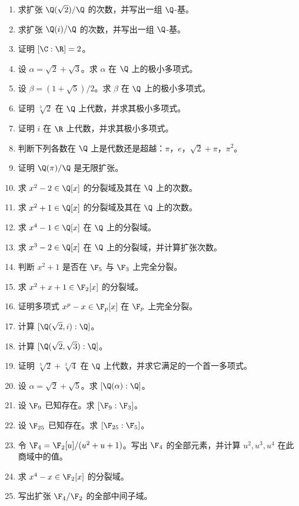 \begin{enumerate}[label=\arabic*., leftmargin=2.5em]
\item \textbf{\basic} 求扩张 $\Q(\sqrt2)/\Q$ 的次数，并写出一组 $\Q$-基。
\item \textbf{\basic} 求扩张 $\Q(i)/\Q$ 的次数，并写出一组 $\Q$-基。
\item \textbf{\basic} 证明 $[\C:\R]=2$。
\item \textbf{\basic} 设 $\alpha=\sqrt2+\sqrt3$。求 $\alpha$ 在 $\Q$ 上的极小多项式。
\item \textbf{\basic} 设 $\beta=(1+\sqrt5)/2$。求 $\beta$ 在 $\Q$ 上的极小多项式。
\item \textbf{\basic} 证明 $\sqrt[3]{2}$ 在 $\Q$ 上代数，并求其极小多项式。
\item \textbf{\basic} 证明 $i$ 在 $\R$ 上代数，并求其极小多项式。
\item \textbf{\basic} 判断下列各数在 $\Q$ 上是代数还是超越：$\pi$，$e$，$\sqrt2+\pi$，$\pi^2$。
\item \textbf{\basic} 证明 $\Q(\pi)/\Q$ 是无限扩张。
\item \textbf{\basic} 求 $x^2-2\in\Q[x]$ 的分裂域及其在 $\Q$ 上的次数。
\item \textbf{\basic} 求 $x^2+1\in\Q[x]$ 的分裂域及其在 $\Q$ 上的次数。
\item \textbf{\basic} 求 $x^4-1\in\Q[x]$ 在 $\Q$ 上的分裂域。
\item \textbf{\basic} 求 $x^3-2\in\Q[x]$ 在 $\Q$ 上的分裂域，并计算扩张次数。
\item \textbf{\basic} 判断 $x^2+1$ 是否在 $\F_5$ 与 $\F_3$ 上完全分裂。
\item \textbf{\basic} 求 $x^2+x+1\in\F_2[x]$ 的分裂域。
\item \textbf{\basic} 证明多项式 $x^p-x\in\F_p[x]$ 在 $\F_p$ 上完全分裂。
\item \textbf{\basic} 计算 $[\Q(\sqrt2,i):\Q]$。
\item \textbf{\basic} 计算 $[\Q(\sqrt2,\sqrt3):\Q]$。
\item \textbf{\basic} 证明 $\sqrt[3]{2}+\sqrt[3]{4}$ 在 $\Q$ 上代数，并求它满足的一个首一多项式。
\item \textbf{\basic} 设 $\alpha=\sqrt2+\sqrt5$。求 $[\Q(\alpha):\Q]$。
\item \textbf{\basic} 设 $\F_9$ 已知存在。求 $[\F_9:\F_3]$。
\item \textbf{\basic} 设 $\F_{25}$ 已知存在。求 $[\F_{25}:\F_5]$。
\item \textbf{\basic} 令 $\F_4=\F_2[u]/(u^2+u+1)$。写出 $\F_4$ 的全部元素，并计算 $u^2,u^3,u^4$ 在此商域中的值。
\item \textbf{\basic} 求 $x^4-x\in\F_2[x]$ 的分裂域。
\item \textbf{\basic} 写出扩张 $\F_4/\F_2$ 的全部中间子域。
\end{enumerate}

